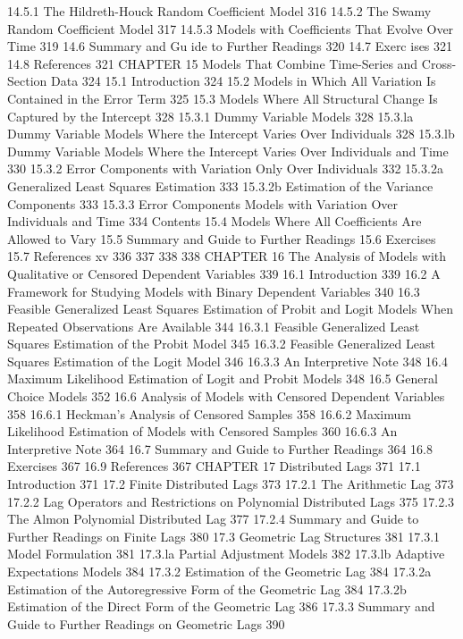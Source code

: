 {14.5.1 The Hildreth-Houck Random Coefficient Model 316
14.5.2 The Swamy Random Coefficient Model 317
14.5.3 Models with Coefficients That Evolve Over Time 319
14.6 Summary and Gu ide to Further Readings 320
14.7 Exerc ises 321
14.8 References 321
CHAPTER 15
Models That Combine Time-Series and Cross-Section Data 324
15.1 Introduction 324
15.2 Models in Which All Variation Is Contained in the Error Term 325
15.3 Models Where All Structural Change Is Captured by the Intercept 328
15.3.1 Dummy Variable Models 328
15.3.la Dummy Variable Models Where the Intercept Varies
Over Individuals 328
15.3.lb Dummy Variable Models Where the Intercept Varies
Over Individuals and Time 330
15.3.2 Error Components with Variation Only Over Individuals 332
15.3.2a Generalized Least Squares Estimation 333
15.3.2b Estimation of the Variance Components 333
15.3.3 Error Components Models with Variation Over Individuals and Time 334
Contents
15.4 Models Where All Coefficients Are Allowed to Vary
15.5 Summary and Guide to Further Readings
15.6 Exercises
15.7 References
xv
336
337
338
338
CHAPTER 16
The Analysis of Models with Qualitative or Censored
Dependent Variables 339
16.1 Introduction 339
16.2 A Framework for Studying Models with Binary Dependent Variables 340
16.3 Feasible Generalized Least Squares Estimation of Probit and Logit
Models When Repeated Observations Are Available 344
16.3.1 Feasible Generalized Least Squares Estimation of the Probit Model 345
16.3.2 Feasible Generalized Least Squares Estimation of the Logit Model 346
16.3.3 An Interpretive Note 348
16.4 Maximum Likelihood Estimation of Logit and Probit Models 348
16.5 General Choice Models 352
16.6 Analysis of Models with Censored Dependent Variables 358
16.6.1 Heckman's Analysis of Censored Samples 358
16.6.2 Maximum Likelihood Estimation of Models with Censored Samples 360
16.6.3 An Interpretive Note 364
16.7 Summary and Guide to Further Readings 364
16.8 Exercises 367
16.9 References 367
CHAPTER 17
Distributed Lags 371
17.1 Introduction 371
17.2 Finite Distributed Lags 373
17.2.1 The Arithmetic Lag 373
17.2.2 Lag Operators and Restrictions on Polynomial Distributed Lags 375
17.2.3 The Almon Polynomial Distributed Lag 377
17.2.4 Summary and Guide to Further Readings on Finite Lags 380
17.3 Geometric Lag Structures 381
17.3.1 Model Formulation 381
17.3.la Partial Adjustment Models 382
17.3.lb Adaptive Expectations Models 384
17.3.2 Estimation of the Geometric Lag 384
17.3.2a Estimation of the Autoregressive Form of the Geometric Lag 384
17.3.2b Estimation of the Direct Form of the Geometric Lag 386
17.3.3 Summary and Guide to Further Readings on Geometric Lags 390
}
